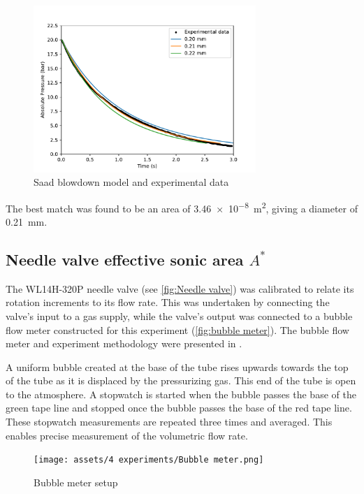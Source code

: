             \begin{figure}[!ht]
                \centering
                \includegraphics[width=0.75\textwidth]{assets/4 experiments/Saad blowdown fit.pdf}
                \caption{Saad blowdown model and experimental data}
                \label{fig:saad blowdown}
            \end{figure}

            The best match was found to be an area of \qty{3.46e-8}{m^2}, giving a diameter of \qty{0.21}{mm}.

        \subsection{Needle valve effective sonic area $A^*$}

            The WL14H-320P needle valve (see \autoref{fig:Needle valve}) was calibrated to relate its rotation increments to its flow rate. This was undertaken by connecting the valve's input to a gas supply, while the valve's output was connected to a bubble flow meter constructed for this experiment (\autoref{fig:bubble meter}). The bubble flow meter and experiment methodology were presented in \textcite{barigouFluidMechanicsSoap1993}.

            A uniform bubble created at the base of the tube rises upwards towards the top of the tube as it is displaced by the pressurizing gas. This end of the tube is open to the atmosphere. A stopwatch is started when the bubble passes the base of the green tape line and stopped once the bubble passes the base of the red tape line. These stopwatch measurements are repeated three times and averaged. This enables precise measurement of the volumetric flow rate.

            \begin{figure}[!ht]
                \centering
                \texttt{[image: assets/4 experiments/Bubble meter.png]}
                \caption{Bubble meter setup}
                \label{fig:bubble meter}
            \end{figure}

